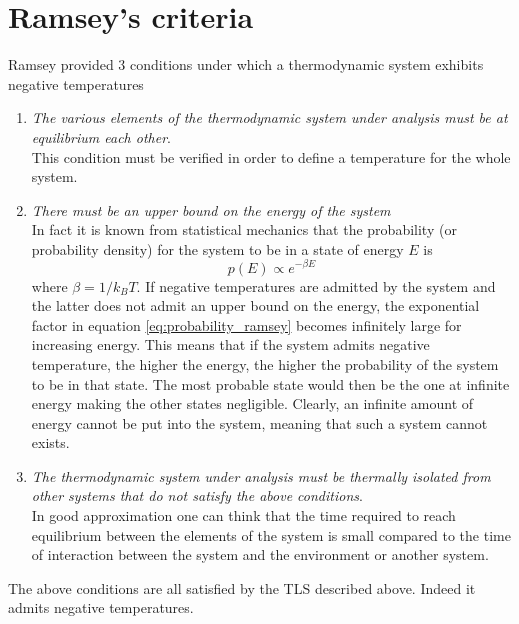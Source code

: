 \section{Ramsey's criteria}
Ramsey %
provided 3 conditions under which a thermodynamic system exhibits negative temperatures
\begin{enumerate}
    \item \emph{The various elements of the thermodynamic system under analysis must be at equilibrium each other}. \\
    This condition must be verified in order to define a temperature for the whole system.
    \item \emph{There must be an upper bound on the energy of the system} \\
    In fact it is known from statistical mechanics that the probability (or probability density) for the system to be in a state of energy $E$ is 
    \begin{equation}
        p(E) \propto e^{-\beta E}
        \label{eq:probability_ramsey}
    \end{equation}
    where $\beta = 1/k_BT$. If negative temperatures are admitted by the system and the latter does not admit an upper bound on the energy, the exponential factor in equation \ref{eq:probability_ramsey}
    becomes infinitely large for increasing energy. This means that if the system admits negative temperature, the higher the energy, the higher the probability of the system to be in that state. The most probable state 
    would then be the one at infinite energy making the other states negligible. Clearly, an infinite amount of energy cannot be put into the system, meaning that such a system cannot exists.
    \item \emph{The thermodynamic system under analysis must be thermally isolated from other systems that do not satisfy the above conditions}. \\
    In good approximation one can think that the time required to reach equilibrium between the elements of the system is small compared to the time of interaction
    between the system and the environment or another system.
\end{enumerate}
The above conditions are all satisfied by the TLS described above. Indeed it admits negative temperatures.